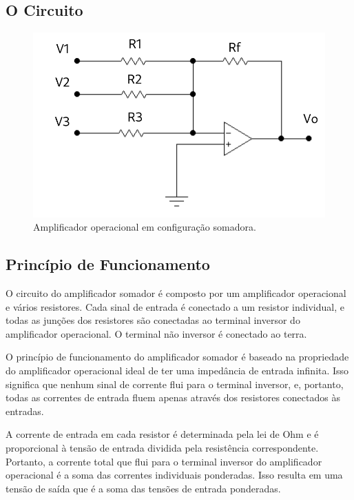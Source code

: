 \documentclass[12pt,twoside, a4paper, twocolumn]{article}
\begin{document}
\subsection{O Circuito}


\begin{figure}[h]
    \centering
    \includegraphics[width=1\columnwidth]{images/opamp_somador.png}
    \caption{Amplificador operacional em configuração somadora.}
\end{figure}


\subsection{Princípio de Funcionamento}


O circuito do amplificador somador é composto por um amplificador operacional e vários resistores. Cada sinal de entrada é conectado a um resistor individual, e todas as junções dos resistores são conectadas ao terminal inversor do amplificador operacional. O terminal não inversor é conectado ao terra.


O princípio de funcionamento do amplificador somador é baseado na propriedade do amplificador operacional ideal de ter uma impedância de entrada infinita. Isso significa que nenhum sinal de corrente flui para o terminal inversor, e, portanto, todas as correntes de entrada fluem apenas através dos resistores conectados às entradas.


A corrente de entrada em cada resistor é determinada pela lei de Ohm e é proporcional à tensão de entrada dividida pela resistência correspondente. Portanto, a corrente total que flui para o terminal inversor do amplificador operacional é a soma das correntes individuais ponderadas. Isso resulta em uma tensão de saída que é a soma das tensões de entrada ponderadas.
\end{document}
